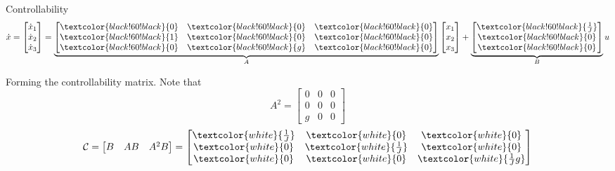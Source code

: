 \documentclass[presentation,aspectratio=169]{beamer}
\begin{document}
\begin{frame}[label={sec:org042ee19}]{Controllability}
\[ \dot{x} = \begin{bmatrix} \dot{x}_1\\\dot{x}_2\\\dot{x}_3\end{bmatrix} = \underbrace{\begin{bmatrix} \textcolor{black!60!black}{0} & \textcolor{black!60!black}{0} &\textcolor{black!60!black}{0} \\\textcolor{black!60!black}{1} & \textcolor{black!60!black}{0}& \textcolor{black!60!black}{0}\\ \textcolor{black!60!black}{0}& \textcolor{black!60!black}{g} &\textcolor{black!60!black}{0} \end{bmatrix}}_{A} \begin{bmatrix} x_1\\x_2\\x_3\end{bmatrix} + \underbrace{\begin{bmatrix} \textcolor{black!60!black}{\frac{1}{J}} \\ \textcolor{black!60!black}{0} \\\textcolor{black!60!black}{0}  \end{bmatrix}}_{B} u \]

Forming the controllability matrix. Note that
\[ A^2 = \begin{bmatrix} 0 &  0 & 0\\ 0 & 0 & 0\\ g & 0 & 0 \end{bmatrix} \]
\[ \mathcal{C} = \begin{bmatrix} B & AB & A^2B\end{bmatrix}
   = \begin{bmatrix} \textcolor{white}{\frac{1}{J}} & \textcolor{white}{0} & \textcolor{white}{0}\\\textcolor{white}{0} & \textcolor{white}{\frac{1}{J}} & \textcolor{white}{0} \\\textcolor{white}{0} & \textcolor{white}{0} & \textcolor{white}{\frac{1}{J}g} \end{bmatrix} \]
\end{frame}
\end{document}

